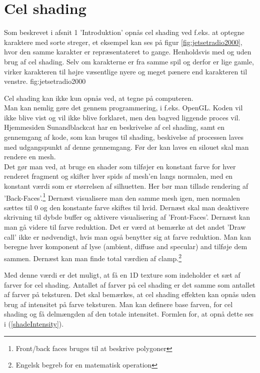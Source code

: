 \newpage
\section{Cel shading}
Som beskrevet i afsnit 1 'Introduktion' opnås cel shading ved f.eks. at optegne karaktere med sorte streger, et eksempel kan ses på figur \ref{fig:jetsetradio2000}, hvor den samme karakter er repræsentateret to gange. Henholdsvis med og uden brug af cel shading. Selv om karakterne er fra samme spil og derfor er lige gamle, virker karakteren til højre væsentlige nyere og meget pænere end karakteren til venstre. 
 {} {fig:jetsetradio2000}

Cel shading kan ikke kun opnås ved, at tegne på computeren.\\ Man kan nemlig gøre det gennem programmering, i f.eks. OpenGL. 
Koden vil ikke blive vist og vil ikke blive forklaret, men den bagved liggende proces vil. Hjemmesiden Sunandblackcat\cite{sunandblackcat2016} har en beskrivelse af cel shading, samt en gennemgang af kode, som kan bruges til shading, beskivelse af processen laves med udgangspunkt af denne gennemgang. Før der kan laves en silouet skal man rendere en mesh. \\
Det gør man ved, at bruge en shader som tilføjer en konstant farve for
hver renderet fragment og skifter hver spids af mesh’en langs normalen, med en konstant værdi
som er størrelsen af silhuetten. Her bør man tillade rendering af ’Back-Faces’.\footnote[2]
{Front/back faces bruges til at beskrive polygoner}
Dernæst visualisere man den samme mesh igen, men normalen sættes til 0 og den konstante farve
skiftes til hvid.
Dernæst skal man deaktivere skrivning til dybde buffer og aktivere
visualisering af ’Front-Faces’. Dernæst kan man gå videre til farve reduktion. Det er værd at
bemærke at det andet ’Draw call’ ikke er nødvendigt, hvis man også benytter sig at farve
reduktion. 
Man kan beregne hver komponent af lyse (ambient, diffuse and specular) and tilføje dem sammen.
Dernæst kan man finde total værdien af clamp.\footnote[3]{Engelsk begreb for en matematisk
operation}

Med denne værdi er det muligt, at få en 1D texture som indeholder et sæt af farver for cel
shading. Antallet af farver på cel shading er det samme som antallet af farver på teksturen.
Det skal bemærkes, at cel shading effekten kan opnås uden brug af intensitet på farve
teksturen. 
Man kan definere base farven, for cel shading og få delmængden af den totale intensitet. Formlen
for, at opnå dette ses i (\ref{shadeIntensity}).

